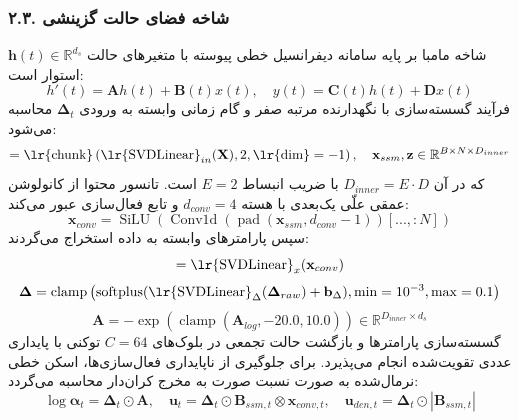 \subsubsection*{۲.۳. شاخه فضای حالت گزینشی }
شاخه مامبا بر پایه سامانه دیفرانسیل خطی پیوسته با متغیرهای حالت $\mathbf{h}(t) \in \mathbb{R}^{d_s}$ استوار است:
\begin{equation}
h'(t) = \mathbf{A} h(t) + \mathbf{B}(t) x(t), \quad y(t) = \mathbf{C}(t) h(t) + \mathbf{D} x(t)
\end{equation}
فرآیند گسسته‌سازی با نگهدارنده مرتبه صفر  و گام زمانی وابسته به ورودی $\mathbf{\Delta}_t$ محاسبه می‌شود:
\begin{equation}
[\mathbf{x}_{ssm}, \mathbf{z}] = \text{\lr{chunk}}\left(\text{\lr{SVDLinear}}_{in}(\mathbf{X}), 2, \text{\lr{dim}}=-1\right), \quad \mathbf{x}_{ssm}, \mathbf{z} \in \mathbb{R}^{B \times N \times D_{inner}}
\end{equation}
که در آن $D_{inner} = E \cdot D$ با ضریب انبساط $E=2$ است. تانسور محتوا از کانولوشن عمقی علّی یک‌بعدی با هسته $d_{conv}=4$ و تابع فعال‌سازی  عبور می‌کند:
\begin{equation}
\mathbf{x}_{conv} = \operatorname{SiLU}\left(\operatorname{Conv1d}(\operatorname{pad}(\mathbf{x}_{ssm}, d_{conv}-1))[..., :N]\right)
\end{equation}
سپس پارامترهای وابسته به داده استخراج می‌گردند:
\begin{equation}
[\mathbf{\Delta}_{raw}, \mathbf{B}_{ssm}, \mathbf{C}_{ssm}] = \text{\lr{SVDLinear}}_x(\mathbf{x}_{conv})
\end{equation}
\begin{equation}
\mathbf{\Delta} = \operatorname{clamp}\left( \operatorname{softplus}(\text{\lr{SVDLinear}}_{\Delta}(\mathbf{\Delta}_{raw}) + \mathbf{b}_\Delta), \min=10^{-3}, \max=0.1 \right)
\end{equation}
\begin{equation}
\mathbf{A} = -\exp\left(\operatorname{clamp}(\mathbf{A}_{log}, -20.0, 10.0)\right) \in \mathbb{R}^{D_{inner} \times d_s}
\end{equation}
گسسته‌سازی پارامترها و بازگشت حالت تجمعی در بلوک‌های $C=64$ توکنی با پایداری عددی تقویت‌شده انجام می‌پذیرد. برای جلوگیری از ناپایداری فعال‌سازی‌ها، اسکن خطی نرمال‌شده به صورت نسبت صورت به مخرج کران‌دار محاسبه می‌گردد:
\begin{equation}
\log \boldsymbol{\alpha}_t = \mathbf{\Delta}_t \odot \mathbf{A}, \quad \mathbf{u}_t = \mathbf{\Delta}_t \odot \mathbf{B}_{ssm, t} \otimes \mathbf{x}_{conv, t}, \quad \mathbf{u}_{den, t} = \mathbf{\Delta}_t \odot |\mathbf{B}_{ssm, t}|
\end{equation}
